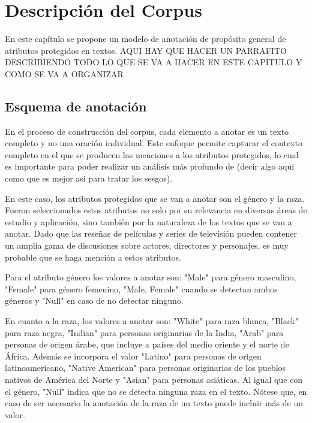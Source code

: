 \chapter{Descripci\'on del Corpus}\label{chapter:proposal}
En este cap\'itulo se propone un modelo de anotaci\'on de prop\'osito general de atributos protegidos
en textos. 
AQUI HAY QUE HACER UN PARRAFITO DESCRIBIENDO TODO LO QUE SE VA A HACER EN ESTE CAPITULO Y COMO SE VA A ORGANIZAR

\section{Esquema de anotaci\'on}
En el proceso de construcci\'on del corpus, cada elemento a anotar es un texto completo y no una oraci\'on individual. 
Este enfoque permite capturar el contexto completo en el que se producen las menciones a los atributos protegidos, 
lo cual es importante para poder realizar un an\'alisis m\'as profundo de (decir algo aqui como que es mejor asi para tratar los sesgos).

En este caso, los atributos protegidos que se van a anotar son el g\'enero y la raza.
Fueron seleccionados estos atributos no solo por su relevancia en diversas \'areas de estudio y aplicaci\'on, sino tambi\'en 
por la naturaleza de los textos que se van a anotar. Dado que las rese\~nas de pel\'iculas y series de televisi\'on
pueden contener un amplia gama de discusiones sobre actores, directores y personajes, es muy probable que se haga menci\'on a 
estos atributos.

Para el atributo g\'enero los valores a anotar son: "Male" para g\'enero masculino, "Female" para g\'enero femenino, 
"Male, Female" cuando se detectan ambos g\'eneros y "Null" en caso de no detectar ninguno.

En cuanto a la raza, los valores a anotar son: "White" para raza blanca, "Black" para raza negra, "Indian" para 
personas originarias de la India, "Arab" para personas de origen \'arabe, que incluye a pa\'ises del medio oriente y el norte de \'Africa.
Adem\'as se incorpora el valor "Latino" para personas de origen latinoamericano, "Native American" para personas originarias de 
los pueblos nativos de Am\'erica del Norte y "Asian" para personas asi\'aticas. Al igual que con el g\'enero, "Null" indica que no se detecta
ninguna raza en el texto. N\'otese que, en caso de ser necesario la anotaci\'on de la raza de un texto puede incluir m\'as de un valor.

